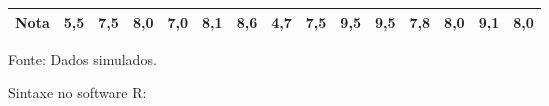 \documentclass[12pt,portuguese,oneside]{book}
\begin{document}
\begin{longtable}[]{@{}lllllllllllllll@{}}
\begin{minipage}[t]{0.10\columnwidth}
\textbf{Nota}\strut
\end{minipage} & \begin{minipage}[t]{0.04\columnwidth}\raggedright\strut
5,5\strut
\end{minipage} & \begin{minipage}[t]{0.04\columnwidth}\raggedright\strut
7,5\strut
\end{minipage} & \begin{minipage}[t]{0.04\columnwidth}\raggedright\strut
8,0\strut
\end{minipage} & \begin{minipage}[t]{0.04\columnwidth}\raggedright\strut
7,0\strut
\end{minipage} & \begin{minipage}[t]{0.04\columnwidth}\raggedright\strut
8,1\strut
\end{minipage} & \begin{minipage}[t]{0.04\columnwidth}\raggedright\strut
8,6\strut
\end{minipage} & \begin{minipage}[t]{0.04\columnwidth}\raggedright\strut
4,7\strut
\end{minipage} & \begin{minipage}[t]{0.04\columnwidth}\raggedright\strut
7,5\strut
\end{minipage} & \begin{minipage}[t]{0.04\columnwidth}\raggedright\strut
9,5\strut
\end{minipage} & \begin{minipage}[t]{0.04\columnwidth}\raggedright\strut
9,5\strut
\end{minipage} & \begin{minipage}[t]{0.04\columnwidth}\raggedright\strut
7,8\strut
\end{minipage} & \begin{minipage}[t]{0.04\columnwidth}\raggedright\strut
8,0\strut
\end{minipage} & \begin{minipage}[t]{0.04\columnwidth}\raggedright\strut
9,1\strut
\end{minipage} & \begin{minipage}[t]{0.04\columnwidth}\raggedright\strut
8,0\strut
\end{minipage}\tabularnewline
\bottomrule
\end{longtable}

Fonte: Dados simulados.

Sintaxe no software R:
\end{document}
